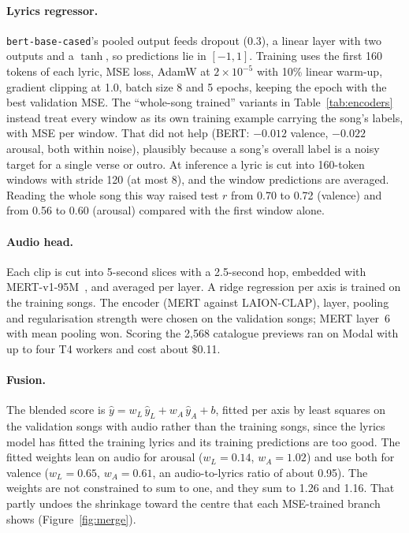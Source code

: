\documentclass[10pt,twocolumn]{article}
\begin{document}
\paragraph{Lyrics regressor.} \texttt{bert-base-cased}'s pooled output feeds dropout (0.3), a linear layer with two outputs and a $\tanh$, so predictions lie in $[-1,1]$. Training uses the first 160 tokens of each lyric, MSE loss, AdamW at $2\times10^{-5}$ with 10\% linear warm-up, gradient clipping at 1.0, batch size 8 and 5 epochs, keeping the epoch with the best validation MSE. The ``whole-song trained'' variants in Table~\ref{tab:encoders} instead treat every window as its own training example carrying the song's labels, with MSE per window. That did not help (BERT: $-0.012$ valence, $-0.022$ arousal, both within noise), plausibly because a song's overall label is a noisy target for a single verse or outro. At inference a lyric is cut into 160-token windows with stride 120 (at most 8), and the window predictions are averaged. Reading the whole song this way raised test $r$ from 0.70 to 0.72 (valence) and from 0.56 to 0.60 (arousal) compared with the first window alone.

\paragraph{Audio head.} Each clip is cut into 5-second slices with a 2.5-second hop, embedded with MERT-v1-95M~\citep{li2024mert}, and averaged per layer. A ridge regression per axis is trained on the training songs. The encoder (MERT against LAION-CLAP), layer, pooling and regularisation strength were chosen on the validation songs; MERT layer~6 with mean pooling won. Scoring the 2,568 catalogue previews ran on Modal with up to four T4 workers and cost about \$0.11.

\paragraph{Fusion.} The blended score is $\hat y = w_L\,\hat y_L + w_A\,\hat y_A + b$, fitted per axis by least squares on the validation songs with audio rather than the training songs, since the lyrics model has fitted the training lyrics and its training predictions are too good. The fitted weights lean on audio for arousal ($w_L=0.14$, $w_A=1.02$) and use both for valence ($w_L=0.65$, $w_A=0.61$, an audio-to-lyrics ratio of about 0.95). The weights are not constrained to sum to one, and they sum to 1.26 and 1.16. That partly undoes the shrinkage toward the centre that each MSE-trained branch shows (Figure~\ref{fig:merge}).
\end{document}
